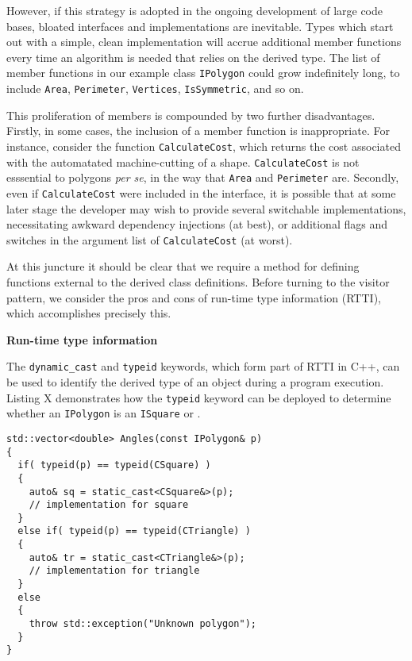 \documentclass[10pt,a4paper,twocolumn]{article}
\renewcommand\section[1]{
    \begin{minipage}[c]{0.94\linewidth}
    \large \raggedright \sffamily \textbf{#1}
    \end{minipage}
}
\newcommand\mycode[1]{{\small\texttt{#1}}}
\begin{document}
However, if this strategy is adopted in the ongoing development of large code bases, bloated interfaces and implementations are inevitable. Types which start out with a simple, clean implementation will accrue additional member functions every time an algorithm is needed that relies on the derived type.  The list of member functions in our example class \mycode{IPolygon} could grow indefinitely long, to include \mycode{Area}, \mycode{Perimeter}, \mycode{Vertices}, \mycode{IsSymmetric}, and so on. 

This proliferation of members is compounded by two further disadvantages. Firstly, in some cases, the inclusion of a member function is inappropriate. For instance, consider the function \mycode{CalculateCost}, which returns the cost associated with the automatated machine-cutting of a shape. \mycode{CalculateCost} is not esssential to polygons \emph{per se}, in the way that \mycode{Area} and \mycode{Perimeter} are. Secondly, even if \mycode{CalculateCost} were included in the interface, it is possible that at some later stage the developer may wish to provide several switchable implementations, necessitating awkward dependency injections (at best), or additional flags and switches in the argument list of \mycode{CalculateCost} (at worst).

At this juncture it should be clear that we require a method for defining functions external to the derived class definitions. Before turning to the visitor pattern, we consider the pros and cons of run-time type information (RTTI), which accomplishes precisely this.


\section{Run-time type information}

The \mycode{dynamic\_cast} and \mycode{typeid} keywords, which form part of RTTI in C++, can be used to identify the derived type of an object during a program execution. Listing X demonstrates how the \mycode{typeid} keyword can be deployed to determine whether an \mycode{IPolygon} is an \mycode{ISquare} or .

\begin{verbatim}
std::vector<double> Angles(const IPolygon& p)
{
  if( typeid(p) == typeid(CSquare) )
  {
    auto& sq = static_cast<CSquare&>(p);
    // implementation for square
  }
  else if( typeid(p) == typeid(CTriangle) )
  {
    auto& tr = static_cast<CTriangle&>(p);
    // implementation for triangle 
  }
  else
  {
    throw std::exception("Unknown polygon");
  }
}
\end{verbatim}
\end{document}
